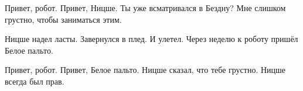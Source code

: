 \X Привет, робот.
\X Привет, Ницше.
\X Ты уже всматривался в Бездну?
\X Мне слишком грустно, чтобы заниматься этим.
\par
Ницше надел ласты. Завернулся в плед. И улетел. Через неделю к роботу пришёл Белое пальто.
\par
\X Привет, робот.
\X Привет, Белое пальто.
\X Ницше сказал, что тебе грустно.
\X Ницше всегда был прав.